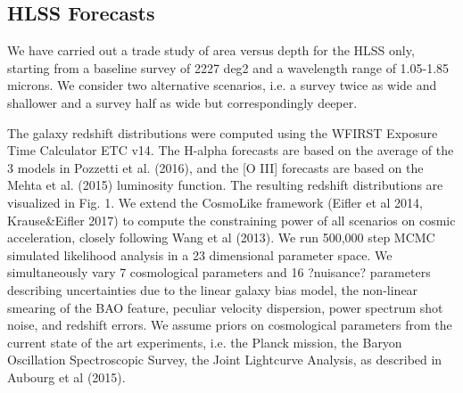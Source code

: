 \newcommand{\nn}{\nonumber}
\newcommand{\vpi}{\mathbf \pi}
\newcommand{\vecd}{\mathbf d}
\newcommand{\matC}{\mathbf C}
\newcommand{\matQ}{\mathbf Q}

\newcommand{\om}{\Omega_\mr m}
\newcommand{\omb}{\Omega_\mr b}
\newcommand{\sig}{\sigma_8}
\newcommand{\ns}{n_s}
\newcommand{\w}{w_0}
\newcommand{\wa}{w_a}

\renewcommand{\d}{{\rm d}}
\newcommand{\pd}{P_{\delta}}
\newcommand{\pe}{P_\mr E}

\newcommand{\vt}{\vartheta}
\newcommand{\vp}{\varphi}
\newcommand{\eps}{\epsilon}
\newcommand{\abs}[1]{| #1 |}
\newcommand{\mr}{\mathrm}

\renewcommand{\d}{{\rm d}}


\subsection{HLSS Forecasts}
We have carried out a trade study of area versus depth for the HLSS only, starting from a baseline survey of 2227 deg2 and a wavelength range of 1.05-1.85 microns. We consider two alternative scenarios, i.e. a survey twice as wide and shallower and a survey half as wide but correspondingly deeper.  

The galaxy redshift distributions were computed using the WFIRST Exposure Time Calculator ETC v14. The H-alpha forecasts are based on the average of the 3 models in Pozzetti et al. (2016), and the [O III] forecasts are based on the Mehta et al. (2015) luminosity function. The resulting redshift distributions are visualized in Fig. 1.
We extend the CosmoLike framework (Eifler et al 2014, Krause\&Eifler 2017) to compute the constraining power of all scenarios on cosmic acceleration, closely following Wang et al (2013). We run 500,000 step MCMC simulated likelihood analysis in a 23 dimensional parameter space. We simultaneously vary 7 cosmological parameters and 16 ?nuisance? parameters describing uncertainties due to the linear galaxy bias model, the non-linear smearing of the BAO feature, peculiar velocity dispersion, power spectrum shot noise, and redshift errors. We assume priors on cosmological parameters from the current state of the art experiments, i.e. the Planck mission, the Baryon Oscillation Spectroscopic Survey, the Joint Lightcurve Analysis, as described in Aubourg et al (2015). 

